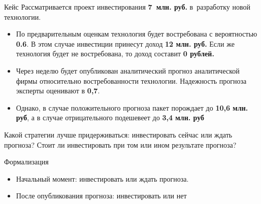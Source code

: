 \documentclass[unicode,11pt,notheorems]{beamer}
\begin{document}
\begin{frame}{Кейс}
	Рассматривается проект инвестирования \textbf{7~млн. руб.} в~разработку новой технологии.
	\begin{itemize}
	\item 
		По предварительным оценкам технология будет востребована с вероятностью \textbf{0.6}. 
		В этом случае инвестиции принесут доход \textbf{12 млн. руб.}
		Если же технология будет не востребована, то доход составит \textbf{0 рублей.}

	\item 
		Через неделю будет опубликован аналитический прогноз аналитической фирмы относительно востребованности технологии.
		Надежность прогноза эксперты оценивают в \textbf{0,7}.
	\item 
		Однако, в случае положительного прогноза пакет порождает до \textbf{10,6 млн. руб}, а в случае отрицательного подешевеет до \textbf{3,4 млн. руб}
\end{itemize}
\alert{Какой стратегии лучше придерживаться: инвестировать сейчас или ждать прогноза?
Стоит ли инвестировать при том или ином результате прогноза? }
\end{frame}

\begin{frame}{Формализация}
	\begin{itemize}
	\item 
		Начальный момент: инвестировать или ждать прогноза.
	\item 
		После опубликования прогноза: инвестировать или нет
	\end{itemize}

\end{frame}
\end{document}
